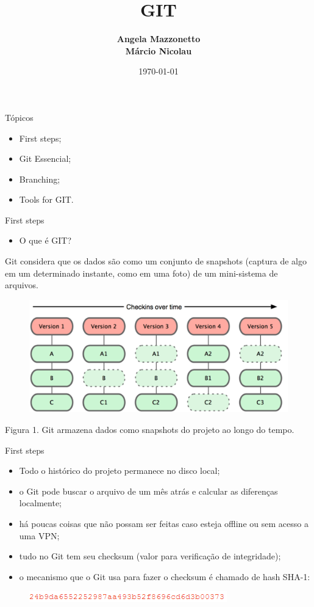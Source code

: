 \documentclass[t]{beamer}
\title{\textbf{GIT}}
\author{\textbf{Angela Mazzonetto \\ Márcio Nicolau}}
\date{\tiny \today{}}
\institute{\small Universidade de Passo Fundo\\
\centering Programa de Pós-Graduação em Computação Aplicada}
\begin{document}
\maketitle

\begin{frame} {Tópicos}
\begin{itemize}
\item First steps;
\item Git Essencial;
\item Branching;
\item Tools for GIT.
\end{itemize}
\end{frame}	

\begin{frame} {First steps}
	\begin{itemize}
		\item O que é GIT?
	\end{itemize}
		Git considera que os dados são como um conjunto de snapshots (captura de algo em um determinado instante, como em uma foto) de um mini-sistema de arquivos.

\begin{figure}[tb!]
	\centering
	\includegraphics[scale=0.5,keepaspectratio=true]{snapshots.png}
\end{figure}
Figura 1. Git armazena dados como snapshots do projeto ao longo do tempo.	
\end{frame}	

\begin{frame} {First steps}
	\begin{itemize}
  \item Todo o histórico do projeto permanece no disco local;
  \item o Git pode buscar o arquivo de um mês atrás e calcular as diferenças localmente;
  \item há poucas coisas que não possam ser feitas caso esteja offline ou sem acesso a uma VPN;
  \item tudo no Git tem seu checksum (valor para verificação de integridade);
  \item o mecanismo que o Git usa para fazer o checksum é chamado de hash SHA-1:
  	\end{itemize}  	
  		\begin{figure}[tb!]
  			\centering
  			\includegraphics[scale=0.8,keepaspectratio=true]{hash.png}
  		\end{figure}
\end{frame}	
\end{document}
